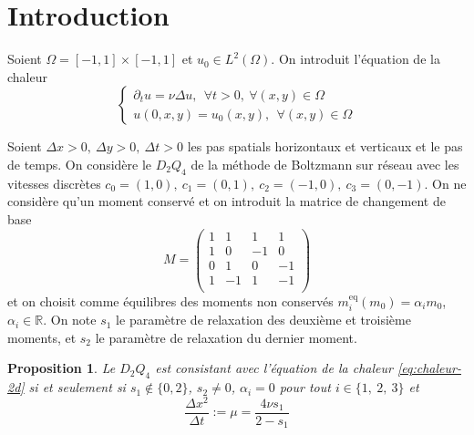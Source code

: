 \documentclass{article}
\newtheorem{prop}{Proposition}
\begin{document}
\section{Introduction}

Soient $\Omega = [-1,1] \times [-1,1]$ et $u_0 \in L^2(\Omega)$. On introduit l'équation de la chaleur
\begin{equation}
    \begin{cases}
        \partial_t u = \nu \Delta u, \ \ \forall t > 0, \ \forall (x,y) \in \Omega\\
        u(0,x,y) = u_0(x,y), \ \ \forall (x,y) \in \Omega
    \end{cases}
    \label{eq:chaleur-2d}
\end{equation}

Soient $\Delta x > 0, \ \Delta y > 0, \ \Delta t > 0$ les pas spatials horizontaux et verticaux et le pas de temps. On considère le $D_2Q_4$ de la méthode de Boltzmann sur réseau avec les vitesses discrètes $c_0 = (1,0),\ c_1=(0,1),\ c_2=(-1,0),\ c_3=(0,-1)$. On ne considère qu'un moment conservé et on introduit la matrice de changement de base
\[
M =
\begin{pmatrix}
    1 & 1 & 1 & 1\\
    1 & 0 & -1 & 0\\
    0 & 1 & 0 & -1\\
    1 & -1 & 1 & -1\\
\end{pmatrix}
\]
et on choisit comme équilibres des moments non conservés $m_i^\text{eq} (m_0) = \alpha_i m_0$, $\alpha_i \in \mathbb{R}$. On note $s_1$ le paramètre de relaxation des deuxième et troisième moments, et $s_2$ le paramètre de relaxation du dernier moment. 

\begin{prop}\label{prop:consistance-D2Q4}
    Le $D_2Q_4$ est consistant avec l'équation de la chaleur \eqref{eq:chaleur-2d} si et seulement si $s_1 \notin \{ 0, 2 \}$, $s_2 \neq 0$, $\alpha_i = 0$ pour tout $i \in \{1,\ 2,\ 3\}$ et
    \[
    \frac{\Delta x^2}{\Delta t} := \mu = \frac{4\nu s_1}{2-s_1}%
    \] 
\end{prop}
\end{document}
